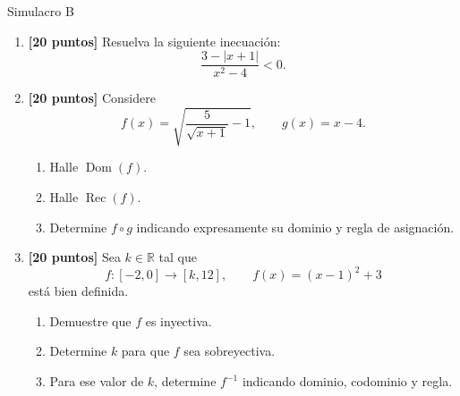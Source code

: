 \documentclass[letterpaper, 12pt]{article}
\newcommand{\R}{\mathbb{R}}
\newcommand{\Dom}{\operatorname{Dom}}
\newcommand{\Rec}{\operatorname{Rec}}
\begin{document}
\begin{pepbox}{Simulacro B}
\begin{enumerate}[label=\textbf{\arabic*.}, leftmargin=*, itemsep=1em]
    \item \textbf{[20 puntos]} Resuelva la siguiente inecuaci\'on:
    \[
        \frac{3-|x+1|}{x^2-4}<0.
    \]

    \item \textbf{[20 puntos]} Considere
    \[
        f(x)=\sqrt{\frac{5}{\sqrt{x+1}}-1},
        \qquad
        g(x)=x-4.
    \]
    \begin{enumerate}[label=\textbf{\alph*)}]
        \item Halle $\Dom(f)$.
        \item Halle $\Rec(f)$.
        \item Determine $f\circ g$ indicando expresamente su dominio y regla de asignaci\'on.
    \end{enumerate}

    \item \textbf{[20 puntos]} Sea $k\in\R$ tal que
    \[
        f:[-2,0]\to[k,12],
        \qquad
        f(x)=(x-1)^2+3
    \]
    est\'a bien definida.
    \begin{enumerate}[label=\textbf{\alph*)}]
        \item Demuestre que $f$ es inyectiva.
        \item Determine $k$ para que $f$ sea sobreyectiva.
        \item Para ese valor de $k$, determine $f^{-1}$ indicando dominio, codominio y regla.
    \end{enumerate}
\end{enumerate}
\end{pepbox}
\end{document}
